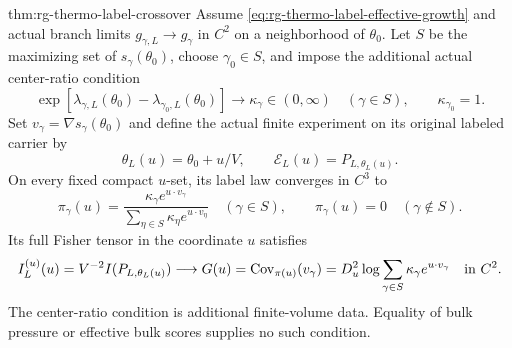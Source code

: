 {thm:rg-thermo-label-crossover}
Assume \cref{eq:rg-thermo-label-effective-growth} and actual branch
limits $g_{\gamma,L}\to g_\gamma$ in $C^2$ on a neighborhood of
$\theta_0$. Let $S$ be the maximizing set of $s_\gamma(\theta_0)$,
choose $\gamma_0\in S$, and impose the additional actual center-ratio
condition
\begin{equation}
 \exp[\lambda_{\gamma,L}(\theta_0)
                 -\lambda_{\gamma_0,L}(\theta_0)]
 \longrightarrow\kappa_\gamma\in(0,\infty)
 \quad(\gamma\in S),\qquad \kappa_{\gamma_0}=1.
 \label{eq:rg-thermo-label-center-ratios}
\end{equation}
Set $v_\gamma=\nabla s_\gamma(\theta_0)$ and define the actual
finite experiment on its original labeled carrier by
\begin{equation}
 \theta_L(u)=\theta_0+u/V,\qquad
 \mathcal E_L(u)=P_{L,\theta_L(u)}.
 \label{eq:rg-thermo-label-window}
\end{equation}
On every fixed compact $u$-set, its label law converges in $C^3$ to
\begin{equation}
 \pi_\gamma(u)=
 \frac{\kappa_\gamma e^{u\cdot v_\gamma}}
      {\sum_{\eta\in S}\kappa_\eta e^{u\cdot v_\eta}}
 \quad(\gamma\in S),\qquad
 \pi_\gamma(u)=0\quad(\gamma\notin S).
 \label{eq:rg-thermo-label-limiting-weights}
\end{equation}
Its full Fisher tensor in the coordinate $u$ satisfies
\begin{equation}
 I_L^{(u)}(u)=V^{-2}I(P_{L,\theta_L(u)})
 \longrightarrow
 G(u)=\operatorname{Cov}_{\pi(u)}(v_\gamma)
 =D_u^2\log\sum_{\gamma\in S}\kappa_\gamma e^{u\cdot v_\gamma}
 \quad\hbox{in }C^2.
 \label{eq:rg-thermo-label-crossover-fisher}
\end{equation}
The center-ratio condition is additional finite-volume data. Equality of
bulk pressure or effective bulk scores supplies no such condition.\thermoestablishedstatus


